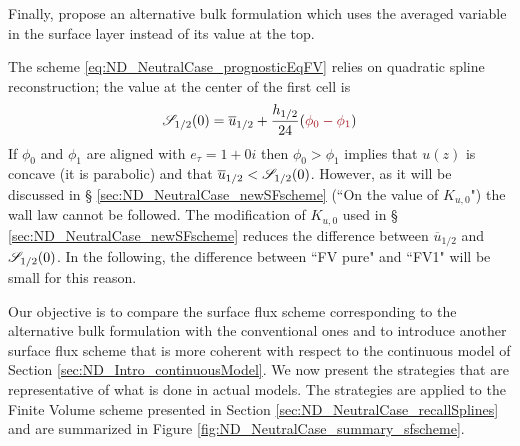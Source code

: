 Finally, \cite{nishizawa_surface_2018} propose an alternative
bulk formulation which uses the averaged variable in the surface layer
instead of its value at the top.
\begin{remark}
The scheme \eqref{eq:ND_NeutralCase_prognosticEqFV} relies
	on quadratic spline reconstruction;
the value at the center of the first cell is
		\begin{equation}
			{\cal S}_{1/2}(0) = \overline{u}_{1/2}
			+ \frac{h_{1/2}}{24} (\emphase{\phi_0-\phi_1})
		\end{equation}
 If $\phi_0$ and $\phi_1$ are aligned with $e_\tau=1+0i$ then
	$\phi_0 > \phi_1$ implies that $u(z)$ is concave
	(it is parabolic) and
	that $\overline{u}_{1/2} < {\cal S}_{1/2}(0)$.
	However, as it will be discussed in \S
	\ref{sec:ND_NeutralCase_newSFscheme}
	(``On the value of $K_{u,0}$")
	the wall law cannot be followed.
	The modification of $K_{u,0}$ used in \S
	\ref{sec:ND_NeutralCase_newSFscheme} reduces
	the difference between $\overline{u}_{1/2}$
	and ${\cal S}_{1/2}(0)$.
	In the following, the
	difference between ``FV pure" and ``FV1"
	will be small for this reason.
\end{remark}
%
Our objective is to compare the surface flux scheme
corresponding to the alternative bulk formulation with the
conventional ones
and to introduce another surface flux scheme that is more coherent
with respect to the continuous model of Section
\ref{sec:ND_Intro_continuousModel}.
We now present the strategies that are representative of
what is done in actual models. The strategies are applied to
the Finite Volume scheme presented in Section
\ref{sec:ND_NeutralCase_recallSplines} and are
summarized in Figure \ref{fig:ND_NeutralCase_summary_sfscheme}.
